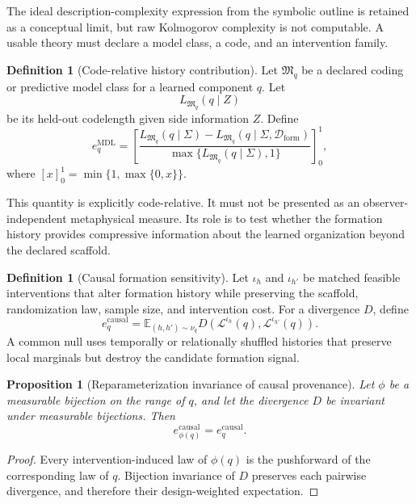 \documentclass[11pt,letterpaper]{article}
\theoremstyle{plain}
\newtheorem{proposition}[theorem]{Proposition}
\theoremstyle{definition}
\newtheorem{definition}[theorem]{Definition}
\begin{document}
The ideal description-complexity expression from the symbolic outline is
retained as a conceptual limit, but raw Kolmogorov complexity is not
computable. A usable theory must declare a model class, a code, and an
intervention family.

\begin{definition}[Code-relative history contribution]\label{def:mdl-endogeneity}
Let \(\mathfrak M_q\) be a declared coding or predictive model class for a
learned component \(q\). Let
\[
L_{\mathfrak M_q}(q\mid Z)
\]
be its held-out codelength given side information \(Z\). Define
\[
\boxed{
 e_q^{\mathrm{MDL}}
 =
 \left[
 \frac{
 L_{\mathfrak M_q}(q\mid\Sigma)
 -
 L_{\mathfrak M_q}(q\mid\Sigma,\mathcal D_{\mathrm{form}})
 }{
 \max\{L_{\mathfrak M_q}(q\mid\Sigma),1\}
 }
 \right]_{0}^{1},
}
\]
where \([x]_0^1=\min\{1,\max\{0,x\}\}\).
\end{definition}

This quantity is explicitly code-relative. It must not be presented as an
observer-independent metaphysical measure. Its role is to test whether the
formation history provides compressive information about the learned
organization beyond the declared scaffold.

\begin{definition}[Causal formation sensitivity]\label{def:causal-formation-sensitivity}
Let \(\iota_h\) and \(\iota_{h'}\) be matched feasible interventions that alter
formation history while preserving the scaffold, randomization law, sample
size, and intervention cost. For a divergence \(D\), define
\[
\boxed{
 e_q^{\mathrm{causal}}
 =
 \mathbb E_{(h,h')\sim\nu_q}
 D\!\left(
 \mathcal L^{\iota_h}(q),
 \mathcal L^{\iota_{h'}}(q)
 \right).
}
\]
A common null uses temporally or relationally shuffled histories that preserve
local marginals but destroy the candidate formation signal.
\end{definition}

\begin{proposition}[Reparameterization invariance of causal provenance]
\label{prop:causal-provenance-invariance}
Let \(\phi\) be a measurable bijection on the range of \(q\), and let the
divergence \(D\) be invariant under measurable bijections. Then
\[
 e_{\phi(q)}^{\mathrm{causal}}
 =
 e_q^{\mathrm{causal}}.
\]
\end{proposition}

\begin{proof}
Every intervention-induced law of \(\phi(q)\) is the pushforward of the
corresponding law of \(q\). Bijection invariance of \(D\) preserves each
pairwise divergence, and therefore their design-weighted expectation.
\end{proof}
\end{document}
